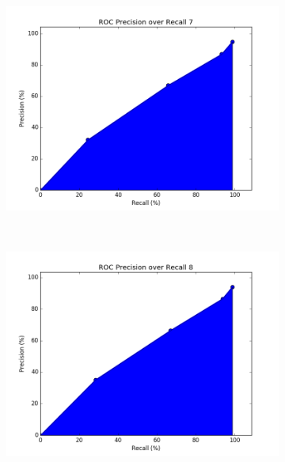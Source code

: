 \documentclass[12pt]{article}
\begin{document}
\begin{figure}[h!]
        \begin{subfigure}[t]{0.5\textwidth}
        \centering
        \includegraphics[width=1.\textwidth]{graphs/problem3_ROC7}
        \caption{}
    \end{subfigure}%
    ~ 
    \begin{subfigure}[t]{0.5\textwidth}
        \centering
        \includegraphics[width=1.\textwidth]{graphs/problem3_ROC8}
        \caption{}
    \end{subfigure}%
\end{figure}
\end{document}
